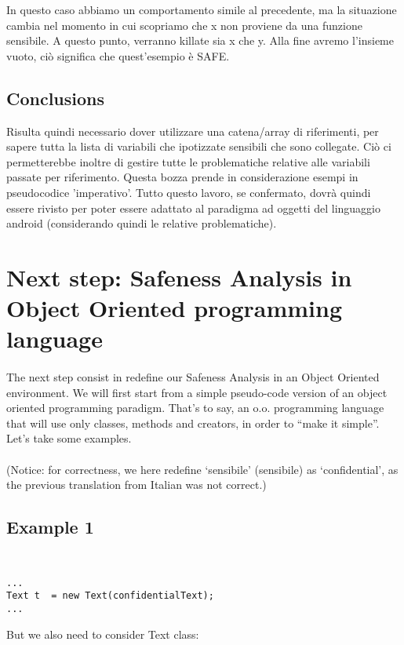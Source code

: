\documentclass[letterpaper,twocolumn,10pt]{article}
\begin{document}
In questo caso abbiamo un comportamento simile al precedente, ma la situazione cambia nel momento in cui scopriamo che x non proviene da una funzione sensibile. A questo punto, verranno killate sia x che y. Alla fine avremo l'insieme vuoto, ci\`o significa che quest'esempio \`e SAFE.\\

\subsection{Conclusions}
Risulta quindi necessario dover utilizzare una catena/array di riferimenti, per sapere tutta la lista di variabili che ipotizzate sensibili che sono collegate. Ci\`o ci permetterebbe inoltre di gestire tutte le problematiche relative alle variabili passate per riferimento.
Questa bozza prende in considerazione esempi in pseudocodice 'imperativo'. Tutto questo lavoro, se confermato, dovr\`a quindi essere rivisto per poter essere adattato al paradigma ad oggetti del linguaggio android (considerando quindi le relative problematiche). \\


\section{Next step: Safeness Analysis in Object Oriented programming language}
\paragraph{}
The next step consist in redefine our Safeness Analysis in an Object Oriented environment. We will first start from a simple pseudo-code version of an object oriented programming paradigm. That's to say, an o.o. programming language that will use only classes, methods and creators, in order to ``make it simple''. Let's take some examples.\\ \\
(Notice: for correctness, we here redefine `sensibile' (sensibile) as `confidential', as the previous translation from Italian was not correct.)\\

\subsection{Example 1}
{\tt \small
\begin{verbatim}
...
Text t	= new Text(confidentialText);
...
\end{verbatim}
}
But we also need to consider Text class: \\
\end{document}
